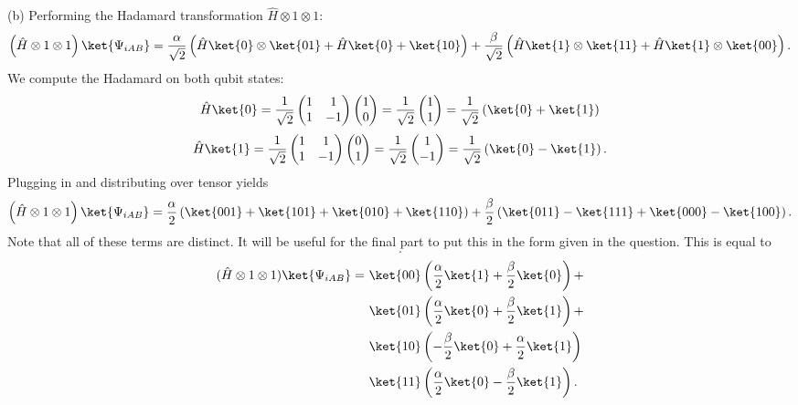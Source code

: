 \documentclass[11pt, letterpaper]{article}
\begin{document}
(b) Performing the Hadamard transformation $\hat{H} \otimes 1\otimes 1$:
\[
	\left( \hat{H} \otimes 1\otimes 1 \right) \ket{\Psi _{iAB} }=\frac{\alpha }{\sqrt{2} } \left( \hat{H}\ket{0}\otimes \ket{01}+ \hat{H} \ket{0}+\ket{10} \right) +\frac{\beta }{\sqrt{2} } \left( \hat{H} \ket{1}\otimes \ket{11}+ \hat{H} \ket{1}\otimes \ket{00} \right) 
.\]
We compute the Hadamard on both qubit states:
\[
	\hat{H} \ket{0} = \frac{1}{\sqrt{2} } \begin{pmatrix}
	1 & 1 \\
	1 & -1
	\end{pmatrix}\begin{pmatrix}
	1 \\
	0
	\end{pmatrix}=\frac{1}{\sqrt{2} } \begin{pmatrix}
	1 \\
	1
\end{pmatrix}=\frac{1}{\sqrt{2} } \left( \ket{0}+\ket{1} \right) 
\]
\[
	\hat{H} \ket{1}=\frac{1}{\sqrt{2} }\begin{pmatrix}
	1 & 1 \\
	1 & -1
	\end{pmatrix}\begin{pmatrix}
	0 \\
	1
	\end{pmatrix}=\frac{1}{\sqrt{2} } \begin{pmatrix}
	1 \\
	-1
\end{pmatrix}=\frac{1}{\sqrt{2} } \left( \ket{0}-\ket{1} \right) 
.\]
Plugging in and distributing over tensor yields
\[
	\left( \hat{H} \otimes 1\otimes 1 \right) \ket{\Psi _{iAB} }=\frac{\alpha }{2} \left( \ket{001}+\ket{101}+\ket{010}+\ket{110} \right) +\frac{\beta }{2} \left( \ket{011}-\ket{111}+\ket{000}-\ket{100} \right) 
.\]
Note that all of these terms are distinct. It will be useful for the final part to put this in the form given in the question. This is equal to
\[
.\]
\begin{align*}
	(\hat{H} \otimes 1\otimes 1)\ket{\Psi _{iAB} }=\,\,&\ket{00}\left( \frac{\alpha }{2} \ket{1}+\frac{\beta }{2} \ket{0} \right) +\\
							   &\ket{01}\left( \frac{\alpha }{2} \ket{0} +\frac{\beta }{2} \ket{1}\right) +\\
							   &\ket{10}\left( -\frac{\beta }{2} \ket{0}+\frac{\alpha }{2} \ket{1} \right) \\
							   &\ket{11}\left( \frac{\alpha }{2} \ket{0}-\frac{\beta }{2} \ket{1} \right) 
.\end{align*}
\end{document}

